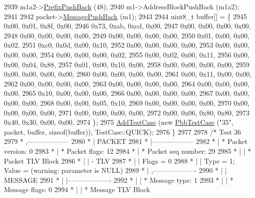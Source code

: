 \begin{DoxyCode}
2939     m1a2->\hyperlink{classns3_1_1PbbAddressBlock_a8e6f539ccffd043a2890396d882d0a42}{PrefixPushBack} (48);
2940     m1->AddressBlockPushBack (m1a2);
2941 
2942     packet->\hyperlink{classns3_1_1PbbPacket_a4a3170001ef758d9c9c4375b8f089826}{MessagePushBack} (m1);
2943 
2944     uint8\_t buffer[] = \{
2945       0x00, 0x01, 0x8f, 0x00,
2946       0x73, 0xab, 0xcd, 0x00,
2947       0x00, 0x00, 0x00, 0x00,
2948       0x00, 0x00, 0x00, 0x00,
2949       0x00, 0x00, 0x00, 0x00,
2950       0x01, 0x00, 0x00, 0x02,
2951       0xc0, 0x0d, 0x00, 0x10,
2952       0x00, 0x00, 0x00, 0x00,
2953       0x00, 0x00, 0x00, 0x00,
2954       0x00, 0x00, 0x00, 0x02,
2955       0x00, 0x02, 0x00, 0x11,
2956       0x00, 0x00, 0x04, 0x88,
2957       0x01, 0x00, 0x10, 0x00,
2958       0x00, 0x00, 0x00, 0x00,
2959       0x00, 0x00, 0x00, 0x00,
2960       0x00, 0x00, 0x00, 0x00,
2961       0x00, 0x11, 0x00, 0x00,
2962       0x00, 0x00, 0x00, 0x00,
2963       0x00, 0x00, 0x00, 0x00,
2964       0x00, 0x00, 0x00, 0x00,
2965       0x10, 0x00, 0x00, 0x00,
2966       0x00, 0x00, 0x00, 0x00,
2967       0x00, 0x00, 0x00, 0x00,
2968       0x00, 0x00, 0x05, 0x10,
2969       0x00, 0x00, 0x00, 0x00,
2970       0x00, 0x00, 0x00, 0x00,
2971       0x00, 0x00, 0x00, 0x00,
2972       0x00, 0x06, 0x80, 0x80,
2973       0x40, 0x30, 0x00, 0x00,
2974     \};
2975     \hyperlink{classns3_1_1TestCase_a3718088e3eefd5d6454569d2e0ddd835}{AddTestCase} (\textcolor{keyword}{new} \hyperlink{classPbbTestCase}{PbbTestCase} (\textcolor{stringliteral}{"35"}, packet, buffer, \textcolor{keyword}{sizeof}(buffer)), 
      TestCase::QUICK);
2976   \}
2977 
2978   \textcolor{comment}{/* Test 36}
2979 \textcolor{comment}{         * ,------------------}
2980 \textcolor{comment}{         * |  PACKET}
2981 \textcolor{comment}{         * |------------------}
2982 \textcolor{comment}{         * | * Packet version:    0}
2983 \textcolor{comment}{         * | * Packet flags:  12}
2984 \textcolor{comment}{         * | * Packet seq number: 29}
2985 \textcolor{comment}{         * |    | * Packet TLV Block}
2986 \textcolor{comment}{         * |    |     - TLV}
2987 \textcolor{comment}{         * |    |         Flags = 0}
2988 \textcolor{comment}{         * |    |         Type = 1; Value = (warning: parameter is NULL)}
2989 \textcolor{comment}{         * |    ,-------------------}
2990 \textcolor{comment}{         * |    |  MESSAGE}
2991 \textcolor{comment}{         * |    |-------------------}
2992 \textcolor{comment}{         * |    | * Message type:       1}
2993 \textcolor{comment}{         * |    | * Message flags:  0}
2994 \textcolor{comment}{         * |    | * Message TLV Block}

\end{DoxyCode}
